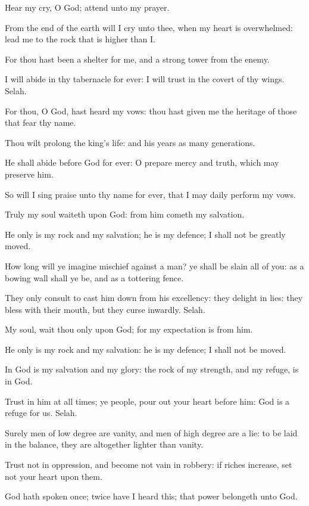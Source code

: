 \Chapter
\Verse Hear my cry, O God; attend unto my prayer.

\Verse From the end of the earth will I cry unto thee, when my heart is overwhelmed: lead me to the rock that is higher than I.

\Verse For thou hast been a shelter for me, and a strong tower from the enemy.

\Verse I will abide in thy tabernacle for ever: I will trust in the covert of thy wings. Selah.

\Verse For thou, O God, hast heard my vows: thou hast given me the heritage of those that fear thy name.

\Verse Thou wilt prolong the king's life: and his years as many generations.

\Verse He shall abide before God for ever: O prepare mercy and truth, which may preserve him.

\Verse So will I sing praise unto thy name for ever, that I may daily perform my vows.




\Chapter
\Verse Truly my soul waiteth upon God: from him cometh my salvation.

\Verse He only is my rock and my salvation; he is my defence; I shall not be greatly moved.

\Verse How long will ye imagine mischief against a man? ye shall be slain all of you: as a bowing wall shall ye be, and as a tottering fence.

\Verse They only consult to cast him down from his excellency: they delight in lies: they bless with their mouth, but they curse inwardly.  Selah.

\Verse My soul, wait thou only upon God; for my expectation is from him.

\Verse He only is my rock and my salvation: he is my defence; I shall not be moved.

\Verse In God is my salvation and my glory: the rock of my strength, and my refuge, is in God.

\Verse Trust in him at all times; ye people, pour out your heart before him: God is a refuge for us. Selah.

\Verse Surely men of low degree are vanity, and men of high degree are a lie: to be laid in the balance, they are altogether lighter than vanity.

\Verse Trust not in oppression, and become not vain in robbery: if riches increase, set not your heart upon them.

\Verse God hath spoken once; twice have I heard this; that power belongeth unto God.


